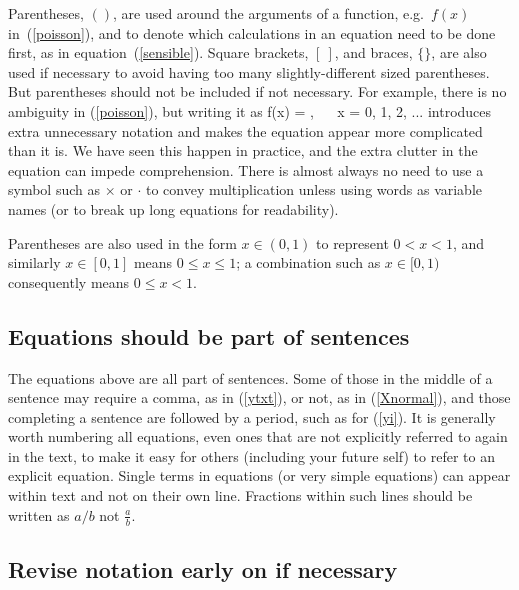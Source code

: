 Parentheses, $()$,
are used
around the arguments of a function, e.g.~$f(x)$ in~(\ref{poisson}), and
to denote which calculations in an equation need to be done first, as
in equation~(\ref{sensible}). Square brackets, $[~]$, and braces, $\{\}$,
are also used if necessary to avoid having too many slightly-different sized
parentheses. But parentheses should not be included if not necessary.
For example, there is no ambiguity in (\ref{poisson}), but writing it as
\eb
f(x) = ,
  ~~ x = 0, 1, 2, ...
\label{poisson2}
\ee
introduces extra unnecessary notation and makes the equation appear more
complicated than it is. We have seen this happen in practice, and the extra
clutter in the equation can impede comprehension. There is almost always
no need to use a symbol such as $\times$ or $\cdot$
to convey multiplication unless using
words as variable names (or to break up long equations for readability).

Parentheses are also used in the form $x \in (0, 1)$ to represent $0 < x < 1$,
and similarly $x \in [0, 1]$ means $0 \leq x \leq 1$; a combination such as
$x \in [0, 1)$ consequently means $0 \leq x < 1$.

\subsection*{Equations should be part of sentences}

The equations above are all part of sentences. Some of those in the middle of
a sentence may require a comma, as in (\ref{ytxt}), or not, as in
(\ref{Xnormal}), and those completing a sentence are followed by a period,
such as for (\ref{yi}). It is generally worth numbering all equations,
even ones that are not explicitly referred to again in the text, to make it easy
for others (including your future self) to refer to an explicit equation.
Single terms in equations (or very simple equations) can appear within
text and not on their own line. Fractions within such lines should be
written as $a/b$ not $\frac{a}{b}$.

\subsection*{Revise notation early on if necessary}

